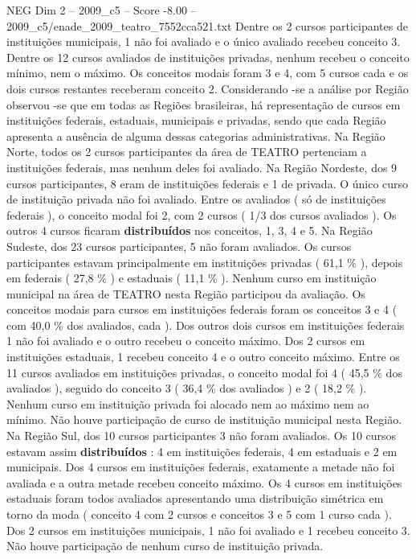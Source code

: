 \begin{textsample}{NEG Dim 2 – 2009\_c5 – Score -8.00 – 2009\_c5/enade\_2009\_teatro\_7552cca521.txt}
Dentre os 2 cursos participantes de instituições municipais, 1 não foi avaliado e o único avaliado recebeu conceito 3.
Dentre os 12 cursos avaliados de instituições privadas, nenhum recebeu o conceito mínimo, nem o máximo.
Os conceitos modais foram 3 e 4, com 5 cursos cada e os dois cursos restantes receberam conceito 2.
Considerando -se a análise por Região observou -se que em todas as Regiões brasileiras, há representação de cursos em instituições federais, estaduais, municipais e privadas, sendo que cada Região apresenta a ausência de alguma dessas categorias administrativas.
Na Região Norte, todos os 2 cursos participantes da área de TEATRO pertenciam a instituições federais, mas nenhum deles foi avaliado.
Na Região Nordeste, dos 9 cursos participantes, 8 eram de instituições federais e 1 de privada.
O único curso de instituição privada não foi avaliado.
Entre os avaliados ( só de instituições federais ), o conceito modal foi 2, com 2 cursos ( 1/3 dos cursos avaliados ).
Os outros 4 cursos ficaram \textbf{distribuídos} nos conceitos, 1, 3, 4 e 5.
Na Região Sudeste, dos 23 cursos participantes, 5 não foram avaliados.
Os cursos participantes estavam principalmente em instituições privadas ( 61,1 \% ), depois em federais ( 27,8 \% ) e estaduais ( 11,1 \% ).
Nenhum curso em instituição municipal na área de TEATRO nesta Região participou da avaliação.
Os conceitos modais para cursos em instituições federais foram os conceitos 3 e 4 ( com 40,0 \% dos avaliados, cada ).
Dos outros dois cursos em instituições federais 1 não foi avaliado e o outro recebeu o conceito máximo.
Dos 2 cursos em instituições estaduais, 1 recebeu conceito 4 e o outro conceito máximo.
Entre os 11 cursos avaliados em instituições privadas, o conceito modal foi 4 ( 45,5 \% dos avaliados ), seguido do conceito 3 ( 36,4 \% dos avaliados ) e 2 ( 18,2 \% ).
Nenhum curso em instituição privada foi alocado nem ao máximo nem ao mínimo.
Não houve participação de curso de instituição municipal nesta Região.
Na Região Sul, dos 10 cursos participantes 3 não foram avaliados.
Os 10 cursos estavam assim \textbf{distribuídos} : 4 em instituições federais, 4 em estaduais e 2 em municipais.
Dos 4 cursos em instituições federais, exatamente a metade não foi avaliada e a outra metade recebeu conceito máximo.
Os 4 cursos em instituições estaduais foram todos avaliados apresentando uma distribuição simétrica em torno da moda ( conceito 4 com 2 cursos e conceitos 3 e 5 com 1 curso cada ).
Dos 2 cursos em instituições municipais, 1 não foi avaliado e 1 recebeu conceito 3.
Não houve participação de nenhum curso de instituição privada.

\end{textsample}
